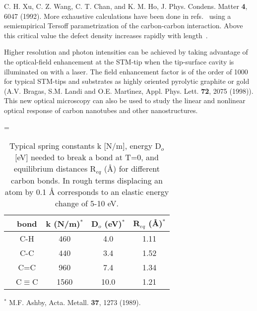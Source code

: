 \begin{multicols}{2}
\begin{thebibliography}{99}
 C. H. Xu, C. Z. Wang, C. T. Chan, and K. M. Ho, J. Phys.
Condens. Matter {\bf 4}, 6047 (1992).
 More exhaustive calculations have
been done in refs.~\cite{Marco,Paul} using a semiempirical Tersoff
parametrization of the carbon-carbon interaction.
Above this critical value the defect density
increases rapidly with length~\cite{Paul}.

 Higher resolution and photon intensities can
be achieved by taking advantage of the optical-field enhancement
at the STM-tip when the tip-surface cavity is illuminated on with
a laser. The field enhancement factor is of the order of 1000 for
typical STM-tips and substrates as highly oriented pyrolytic
graphite or gold (A.V. Bragas, S.M. Landi and O.E. Mart\'{\i }nez,
Appl. Phys. Lett. {\bf 72}, 2075 (1998)). This new optical
microscopy can also be used to study the linear and nonlinear
optical response of carbon nanotubes and other nanostructures.

\end{thebibliography}

 = \hbox{\cite{Hernandez}}
\begin{table}
\caption{ Typical spring constants k [N/m], energy D$_{o}$ [eV] needed to break a bond at T=0, and equilibrium distances R$_{eq}$ ({\AA}) for different carbon bonds. In rough terms displacing an atom by 0.1 {\AA} corresponds to an elastic energy change of 5-10 eV. }
\begin{tabular}{c|c|c|c|c|}
& bond & k (N/m)$^*$ & D$_{o}$ (eV)$^*$ & R$_{eq}$ ({\AA})$^*$ \\ \hline
& C-H & 460 & 4.0 & 1.11 \\ & C-C & 440 & 3.4 & 1.52 \\ 
& C=C &960 & 7.4 & 1.34 \\ & C$\equiv$C & 1560 & 10.0 & 1.21 \\
\end{tabular}
$^*$ M.F. Ashby, Acta. Metall. {\bf 37}, 1273 (1989).
\end{table}


\end{multicols}
